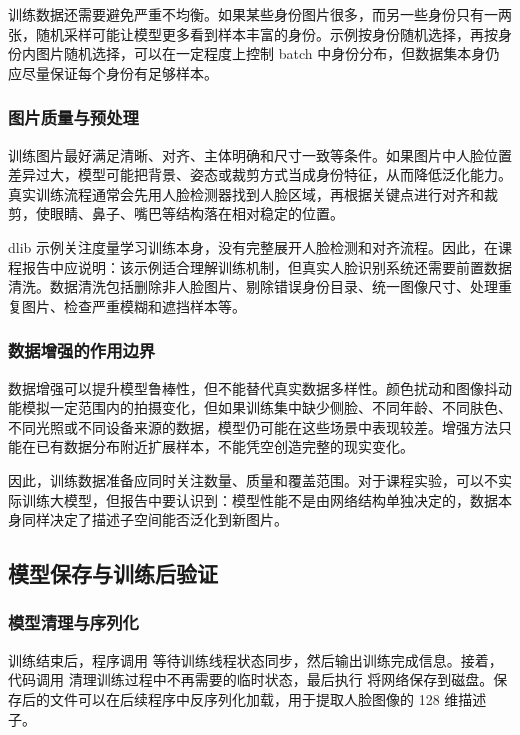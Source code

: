 训练数据还需要避免严重不均衡。如果某些身份图片很多，而另一些身份只有一两张，随机采样可能让模型更多看到样本丰富的身份。示例按身份随机选择，再按身份内图片随机选择，可以在一定程度上控制 batch 中身份分布，但数据集本身仍应尽量保证每个身份有足够样本。

\subsubsection{图片质量与预处理}

训练图片最好满足清晰、对齐、主体明确和尺寸一致等条件。如果图片中人脸位置差异过大，模型可能把背景、姿态或裁剪方式当成身份特征，从而降低泛化能力。真实训练流程通常会先用人脸检测器找到人脸区域，再根据关键点进行对齐和裁剪，使眼睛、鼻子、嘴巴等结构落在相对稳定的位置。

dlib 示例关注度量学习训练本身，没有完整展开人脸检测和对齐流程。因此，在课程报告中应说明：该示例适合理解训练机制，但真实人脸识别系统还需要前置数据清洗。数据清洗包括删除非人脸图片、剔除错误身份目录、统一图像尺寸、处理重复图片、检查严重模糊和遮挡样本等。

\subsubsection{数据增强的作用边界}

数据增强可以提升模型鲁棒性，但不能替代真实数据多样性。颜色扰动和图像抖动能模拟一定范围内的拍摄变化，但如果训练集中缺少侧脸、不同年龄、不同肤色、不同光照或不同设备来源的数据，模型仍可能在这些场景中表现较差。增强方法只能在已有数据分布附近扩展样本，不能凭空创造完整的现实变化。

因此，训练数据准备应同时关注数量、质量和覆盖范围。对于课程实验，可以不实际训练大模型，但报告中要认识到：模型性能不是由网络结构单独决定的，数据本身同样决定了描述子空间能否泛化到新图片。

\subsection{模型保存与训练后验证}

\subsubsection{模型清理与序列化}

训练结束后，程序调用  等待训练线程状态同步，然后输出训练完成信息。接着，代码调用  清理训练过程中不再需要的临时状态，最后执行  将网络保存到磁盘。保存后的文件可以在后续程序中反序列化加载，用于提取人脸图像的 128 维描述子。

